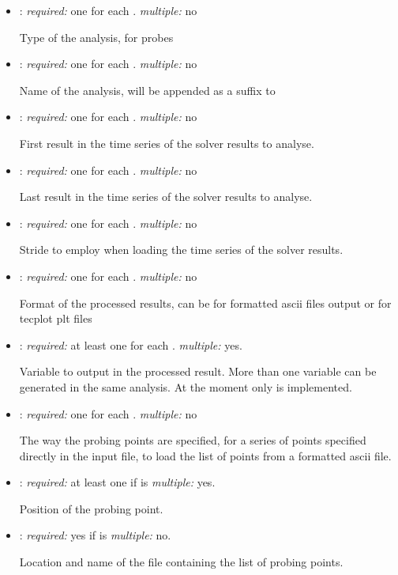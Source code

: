 \begin{itemize}
\item {}: \textit{required:} one for each . \textit{multiple:} no

Type of the analysis,  for probes

\item {}: \textit{required:} one for each . \textit{multiple:} no

Name of the analysis, will be appended as a suffix to 

\item {}: \textit{required:} one for each . \textit{multiple:} no

First result in the time series of the solver results to analyse.

\item {}: \textit{required:} one for each . \textit{multiple:} no

Last result in the time series of the solver results to analyse.

\item {}: \textit{required:} one for each . \textit{multiple:} no

Stride to employ when loading the time series of the solver results. 

\item {}: \textit{required:} one for each . \textit{multiple:} no

Format of the processed results, can be  for formatted ascii files output or  for tecplot plt files

\item {}: \textit{required:} at least one for each . \textit{multiple:} yes.

Variable to output in the processed result. More than one variable can be generated in the same analysis. At the moment only  is implemented.

\item {}: \textit{required:} one for each . \textit{multiple:} no

The way the probing points are specified,  for a series of points specified directly in the input file,  to load the list of points from a formatted ascii file.

\item {}: \textit{required:} at least one if  is  \textit{multiple:} yes.

Position of the probing point.

\item {}: \textit{required:} yes if  is  \textit{multiple:} no.

Location and name of the file containing the list of probing points.

\end{itemize}

